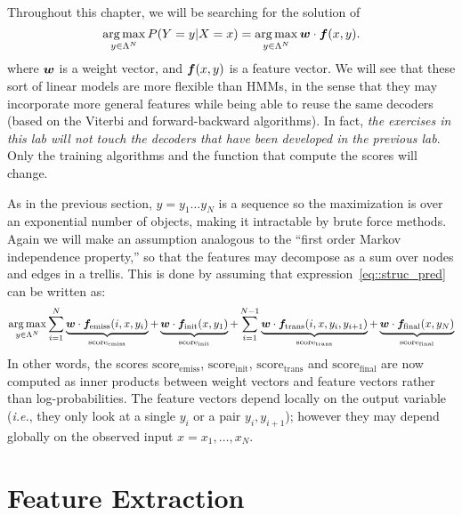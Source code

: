 Throughout this chapter, we will be searching for the solution of 
\begin{equation}
\operatorname*{arg\,max}_{y \in \Lambda^N} P(Y=y | X=x) = \operatorname*{arg\,max}_{y \in \Lambda^N} \boldsymbol{w} \cdot  \boldsymbol{f}(x,y). \label{eq::struc_pred} 
\end{equation}
where $\boldsymbol{w}$ is a weight vector, and $\boldsymbol{f}(x,y)$ is a feature vector. We will see that these sort of linear models are more flexible than HMMs, in the sense that they may incorporate 
more general features while being able to reuse the same decoders (based on the Viterbi and forward-backward algorithms). In fact, \emph{the exercises in this lab will not touch the decoders that 
have been developed in the previous lab}. Only the training algorithms and the function that 
compute the scores will change.

As in the previous section, $y = y_1\ldots y_N$ is a sequence so the maximization
is over an exponential number of objects, making it intractable by brute force methods. Again
we will make an assumption analogous to the ``first order Markov independence property,'' so that the
features may decompose as a sum over nodes and edges in a trellis. 
This is done by assuming that expression~\ref{eq::struc_pred} can be written as:
\begin{equation}
\operatorname*{arg\,max}_{y \in \Lambda^N} 
\sum_{i=1}^N \underbrace{\boldsymbol{w} \cdot \boldsymbol{f}_{\mathrm{emiss}}(i,x,y_i)}_{\mathrm{score}_{\mathrm{emiss}}}  + 
\underbrace{\boldsymbol{w} \cdot \boldsymbol{f}_{\mathrm{init}}(x,y_1)}_{\mathrm{score}_{\mathrm{init}}}  + 
\sum_{i=1}^{N-1} \underbrace{\boldsymbol{w} \cdot \boldsymbol{f}_{\mathrm{trans}}(i,x,y_i,y_{i+1})}_{\mathrm{score}_{\mathrm{trans}}}+ 
\underbrace{\boldsymbol{w} \cdot \boldsymbol{f}_{\mathrm{final}}(x,y_N)}_{\mathrm{score}_{\mathrm{final}}}
\label{eq::struc_pred_decompose}
\end{equation}
In other words, the scores ${\mathrm{score}_{\mathrm{emiss}}}$, 
${\mathrm{score}_{\mathrm{init}}}$, ${\mathrm{score}_{\mathrm{trans}}}$
and ${\mathrm{score}_{\mathrm{final}}}$ are now computed as inner products 
between weight vectors and feature vectors rather than log-probabilities.
The feature vectors depend locally on the output variable 
(\emph{i.e.}, they only look at a single $y_i$ or a pair $y_i,y_{i+1}$);
however they may depend globally on the observed input $x=x_{1},\ldots,x_{N}$.

\section{\label{seq::features} Feature Extraction}

